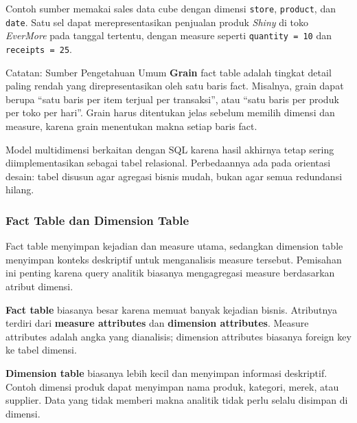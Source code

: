 Contoh sumber memakai sales data cube dengan dimensi \texttt{store}, \texttt{product}, dan \texttt{date}. Satu sel dapat merepresentasikan penjualan produk \textit{Shiny} di toko \textit{EverMore} pada tanggal tertentu, dengan measure seperti \texttt{quantity = 10} dan \texttt{receipts = 25}.

\begin{cmt}{Catatan: Sumber Pengetahuan Umum}{}
\textbf{Grain} fact table adalah tingkat detail paling rendah yang direpresentasikan oleh satu baris fact. Misalnya, grain dapat berupa ``satu baris per item terjual per transaksi'', atau ``satu baris per produk per toko per hari''. Grain harus ditentukan jelas sebelum memilih dimensi dan measure, karena grain menentukan makna setiap baris fact.
\end{cmt}

Model multidimensi berkaitan dengan SQL karena hasil akhirnya tetap sering diimplementasikan sebagai tabel relasional. Perbedaannya ada pada orientasi desain: tabel disusun agar agregasi bisnis mudah, bukan agar semua redundansi hilang.

\subsubsection{Fact Table dan Dimension Table}

\begin{jawab}
Fact table menyimpan kejadian dan measure utama, sedangkan dimension table menyimpan konteks deskriptif untuk menganalisis measure tersebut. Pemisahan ini penting karena query analitik biasanya mengagregasi measure berdasarkan atribut dimensi.
\end{jawab}

\textbf{Fact table} biasanya besar karena memuat banyak kejadian bisnis. Atributnya terdiri dari \textbf{measure attributes} dan \textbf{dimension attributes}. Measure attributes adalah angka yang dianalisis; dimension attributes biasanya foreign key ke tabel dimensi.

\textbf{Dimension table} biasanya lebih kecil dan menyimpan informasi deskriptif. Contoh dimensi produk dapat menyimpan nama produk, kategori, merek, atau supplier. Data yang tidak memberi makna analitik tidak perlu selalu disimpan di dimensi.

